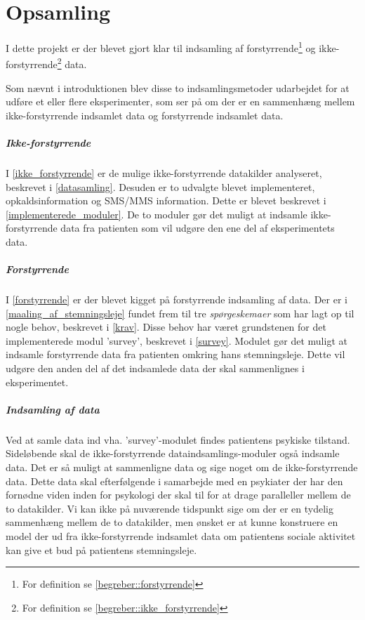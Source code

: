 \chapter{Opsamling}
I dette projekt er der blevet gjort klar til indsamling af  forstyrrende\footnote{For definition se \cref{begreber::forstyrrende}} og ikke-forstyrrende\footnote{For definition se \cref{begreber::ikke_forstyrrende}} data. 

Som nævnt i introduktionen blev disse to indsamlingsmetoder udarbejdet for at udføre et eller flere eksperimenter, som ser på om der er en sammenhæng mellem ikke-forstyrrende indsamlet data og forstyrrende indsamlet data.

\paragraph{Ikke-forstyrrende}
I \cref{ikke_forstyrrende} er de mulige ikke-forstyrrende datakilder analyseret, beskrevet i \cref{datasamling}.
Desuden er to udvalgte blevet implementeret, opkaldsinformation og SMS/MMS information.
Dette er blevet beskrevet i \cref{implementerede_moduler}.
De to moduler gør det muligt at indsamle ikke-forstyrrende data fra patienten som vil udgøre den ene del af eksperimentets data.

\paragraph{Forstyrrende}
I \cref{forstyrrende} er der blevet kigget på forstyrrende indsamling af data.
Der er i \cref{maaling_af_stemningsleje} fundet frem til tre \textit{spørgeskemaer} som har lagt op til nogle behov, beskrevet i \cref{krav}.
Disse behov har været grundstenen for det implementerede modul 'survey', beskrevet i \cref{survey}.
Modulet gør det muligt at indsamle forstyrrende data fra patienten omkring hans stemningsleje.
Dette vil udgøre den anden del af det indsamlede data der skal sammenlignes i eksperimentet.

\paragraph{Indsamling af data}
Ved at samle data ind vha. 'survey'-modulet findes patientens psykiske tilstand.
Sideløbende skal de ikke-forstyrrende dataindsamlings-moduler også indsamle data.
Det er så muligt at sammenligne data og sige noget om de ikke-forstyrrende data.
Dette data skal efterfølgende i samarbejde med en psykiater der har den fornødne viden inden for psykologi der skal til for at drage paralleller mellem de to datakilder.
Vi kan ikke på nuværende tidspunkt sige om der er en tydelig sammenhæng mellem de to datakilder, men ønsket er at kunne konstruere en model der ud fra ikke-forstyrrende indsamlet data om patientens sociale aktivitet kan give et bud på patientens stemningsleje.


